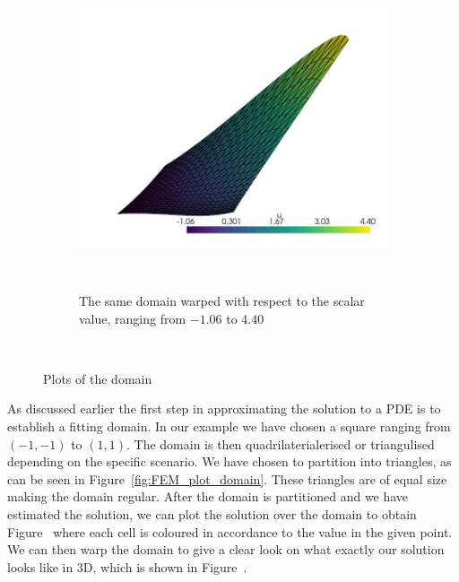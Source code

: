\begin{figure}[H]
\begin{subfigure}{.49\textwidth}
    \end{subfigure}
    \begin{subfigure}{.49\textwidth}
        \centering
        \includegraphics[width=\textwidth]{Afsnit/Application/figurer/screenshot_3.jpeg}
        \caption{The same domain warped with respect to the scalar value, ranging from $-1.06$ to $4.40$}~\label{fig:FEM_plot_3D}
    \end{subfigure}
    \caption{Plots of the domain}~\label{fig:FEM_plots}
\end{figure}

As discussed earlier the first step in approximating the solution to a PDE is to establish a fitting domain. In our example we have chosen a square ranging from $(-1,-1)$ to $(1,1)$.
The domain is then quadrilaterialerised or triangulised depending on the specific scenario. 
We have chosen to partition into triangles, as can be seen
in Figure~\ref{fig:FEM_plot_domain}. 
These triangles are of equal size making the domain regular.
After the domain is partitioned and we have estimated the solution,
we can plot the solution over the domain to obtain Figure~ 
where each cell is coloured in accordance to the value in the given point.
We can then warp the domain to give a clear look on what exactly our solution looks like in 3D, 
which is shown in Figure~.

